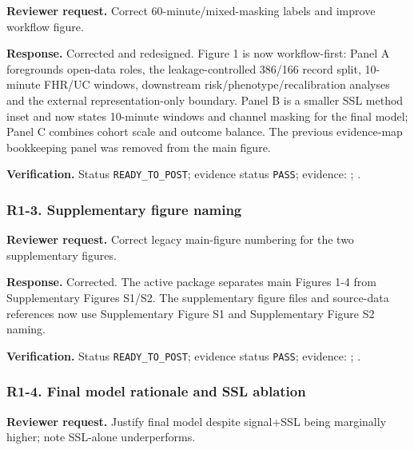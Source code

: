 \documentclass[11pt]{article}
\begin{document}
\textbf{Reviewer request.} Correct 60-minute/mixed-masking labels and improve workflow figure.


\textbf{Response.} Corrected and redesigned. Figure 1 is now workflow-first: Panel A foregrounds open-data roles, the leakage-controlled 386/166 record split, 10-minute FHR/UC windows, downstream risk/phenotype/recalibration analyses and the external representation-only boundary. Panel B is a smaller SSL method inset and now states 10-minute windows and channel masking for the final model; Panel C combines cohort scale and outcome balance. The previous evidence-map bookkeeping panel was removed from the main figure.


\textbf{Verification.} Status \texttt{READY\_TO\_POST}; evidence status \texttt{PASS}; evidence: ; .


\subsubsection*{R1-3. Supplementary figure naming}

\textbf{Reviewer request.} Correct legacy main-figure numbering for the two supplementary figures.


\textbf{Response.} Corrected. The active package separates main Figures 1-4 from Supplementary Figures S1/S2. The supplementary figure files and source-data references now use Supplementary Figure S1 and Supplementary Figure S2 naming.


\textbf{Verification.} Status \texttt{READY\_TO\_POST}; evidence status \texttt{PASS}; evidence: ; .


\subsubsection*{R1-4. Final model rationale and SSL ablation}

\textbf{Reviewer request.} Justify final model despite signal+SSL being marginally higher; note SSL-alone underperforms.
\end{document}
